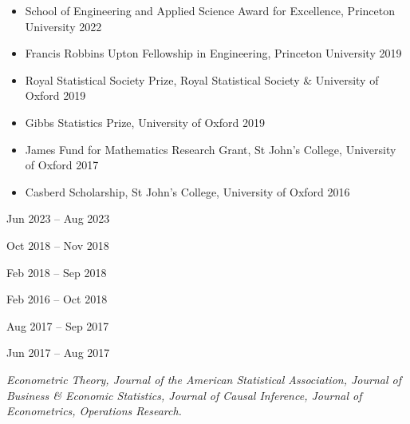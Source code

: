 \documentclass{wgu-cv}
\begin{document}
\begin{itemize}
  \item School of Engineering and Applied Science Award for Excellence,
    Princeton University
    \hfill 2022%
  \item Francis Robbins Upton Fellowship in Engineering,
    Princeton University
    \hfill 2019%
  \item Royal Statistical Society Prize,
    Royal Statistical Society \& University of Oxford
    \hfill 2019%
  \item Gibbs Statistics Prize,
    University of Oxford
    \hfill 2019%
  \item James Fund for Mathematics Research Grant,
    St John's College, University of Oxford
    \hfill 2017%
  \item Casberd Scholarship,
    St John's College, University of Oxford
    \hfill 2016%
\end{itemize}


{Jun 2023 -- Aug 2023}
\vspace{-0.20cm}

{Oct 2018 -- Nov 2018}
\vspace{-0.18cm}

{Feb 2018 -- Sep 2018}
\vspace{-0.20cm}

{Feb 2016 -- Oct 2018}
\vspace{-0.20cm}

{Aug 2017 -- Sep 2017}
\vspace{-0.20cm}

{Jun 2017 -- Aug 2017}
\vspace{-0.20cm}


\emph{Econometric Theory,
  Journal of the American Statistical Association,
  Journal of Business \& Economic Statistics,
  Journal of Causal Inference,
  Journal of Econometrics,
Operations Research.}
\end{document}
